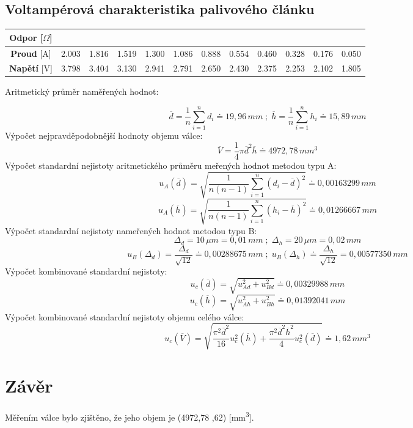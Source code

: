 \documentclass[11pt, a4paper]{report}
\begin{document}
\section{Voltampérová charakteristika palivového článku}

\begin{center}
	\renewcommand{\arraystretch}{1.5}
	\begin{table}[h]
		\centering
		\begin{tabular}{|c|c|c|c|c|c|c|c|c|c|c|c|}

            \hline
            \textbf{Odpor [$\Omega$]}\\
            
			\hline
			\textbf{Proud} [A]  & 2.003 & 1.816 & 1.519 & 1.300 & 1.086 & 0.888 & 0.554 & 0.460 & 0.328 & 0.176 & 0.050 \\

			\hline
			\textbf{Napětí} [V] & 3.798 & 3.404 & 3.130 & 2.941 & 2.791 & 2.650 & 2.430 & 2.375 & 2.253 & 2.102 & 1.805 \\

			
		\end{tabular}
	\end{table}


\end{center}
\clearpage
\noindent Aritmetický průměr naměřených hodnot: \newline

\Large\[\overline{d} = \frac{1}{n}\sum_{i=1}^{n}d_i \doteq 19,96\,mm\;;\;\overline{h} = \frac{1}{n}\sum_{i=1}^{n}h_i \doteq 15,89\,mm\]
\normalsize
\newline Výpočet nejpravděpodobnější hodnoty objemu válce: \newline
\Large\[\overline{V} = \frac{1}{4}\pi\overline{d}^2\overline{h} \doteq 4 972,78\,mm^3\]
\normalsize
\newline Výpočet standardní nejistoty aritmetického průměru meřených hodnot metodou typu A:
\Large\[u_A(\overline{d})= \sqrt{\frac{1}{n(n-1)}\sum_{i=1}^{n}(d_i - \overline{d})^2} \doteq 0,00163299\,mm\]
\[u_A(\overline{h})= \sqrt{\frac{1}{n(n-1)}\sum_{i=1}^{n} (h_i - \overline{h})^2} \doteq 0,01266667\,mm\]
\normalsize
\newline
\noindent Výpočet standardní nejistoty nameřených hodnot metodou typu B:
\Large\[\Delta_d = 10\, \mu m = 0,01\,mm\;;\;\Delta_h = 20\, \mu m = 0,02\,mm\]
\[u_B(\Delta_d) = \frac{\Delta_d}{\sqrt{12}} \doteq 0,00288675\,mm\;;\;u_B(\Delta_h) \doteq \frac{\Delta_h}{\sqrt{12}} = 0,00577350\,mm\]
\newline
\normalsize Výpočet kombinované standardní nejistoty:
\Large\[u_c(\overline{d}) = \sqrt{u_{Ad}^2 + u_{Bd}^2}\doteq0,00329988\,mm\]
\[u_c(\overline{h}) = \sqrt{u_{Ah}^2 + u_{Bh}^2}\doteq  0,01392041\,mm\]
\normalsize
\newline
\noindent Výpočet kombinované standardní nejistoty objemu celého válce:
\Large\[u_c(\overline{V}) = \sqrt{\frac{\pi^2\overline{d}^2}{16}u_c^2(\overline{h})+ \frac{\pi^2\overline{d}^2\overline{h}^2}{4}u_c^2(\overline{d})} \doteq 1,62\,mm^3\]


\chapter{Závěr}
\normalsize Měřením válce bylo zjištěno, že jeho objem je (4972,78 \pm{},62) [mm\textsuperscript{3}].
\end{document}
